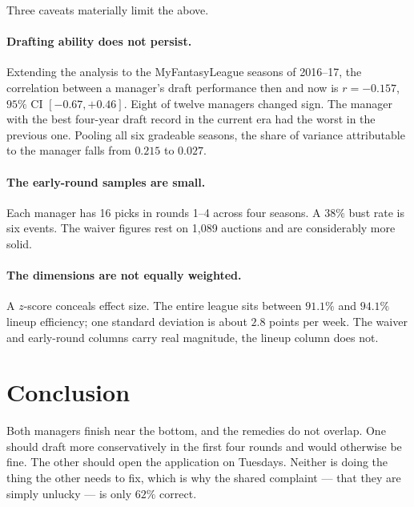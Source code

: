 \documentclass[11pt]{article}
\begin{document}
Three caveats materially limit the above.

\paragraph{Drafting ability does not persist.} Extending the analysis to the
MyFantasyLeague seasons of 2016--17, the correlation between a manager's draft
performance then and now is $r = -0.157$, $95\%$ CI $[-0.67, +0.46]$. Eight of
twelve managers changed sign. The manager with the best four-year draft record in
the current era had the worst in the previous one. Pooling all six gradeable
seasons, the share of variance attributable to the manager falls from $0.215$ to
$0.027$.

\paragraph{The early-round samples are small.} Each manager has 16 picks in
rounds 1--4 across four seasons. A $38\%$ bust rate is six events. The waiver
figures rest on 1{,}089 auctions and are considerably more solid.

\paragraph{The dimensions are not equally weighted.} A $z$-score conceals effect
size. The entire league sits between $91.1\%$ and $94.1\%$ lineup efficiency; one
standard deviation is about $2.8$ points per week. The waiver and early-round
columns carry real magnitude, the lineup column does not.

\section{Conclusion}

Both managers finish near the bottom, and the remedies do not overlap. One should
draft more conservatively in the first four rounds and would otherwise be fine.
The other should open the application on Tuesdays. Neither is doing the thing the
other needs to fix, which is why the shared complaint --- that they are simply
unlucky --- is only $62\%$ correct.
\end{document}
